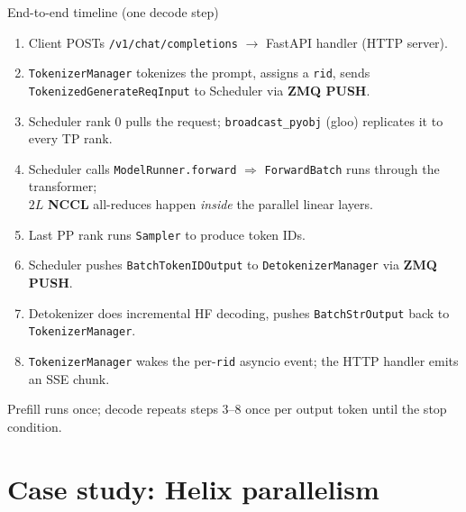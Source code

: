 \documentclass[aspectratio=169,10pt]{beamer}
\begin{document}
\begin{frame}{End-to-end timeline (one decode step)}
  \footnotesize
  \begin{enumerate}\itemsep2pt
    \item Client POSTs \texttt{/v1/chat/completions} $\rightarrow$ FastAPI handler (HTTP server).
    \item \texttt{TokenizerManager} tokenizes the prompt, assigns a \texttt{rid}, sends \texttt{TokenizedGenerateReqInput} to Scheduler via \textcolor{slblue}{\textbf{ZMQ PUSH}}.
    \item Scheduler rank 0 pulls the request; \texttt{broadcast\_pyobj} (gloo) replicates it to every TP rank.
    \item Scheduler calls \texttt{ModelRunner.forward} $\Rightarrow$ \texttt{ForwardBatch} runs through the transformer;\\
          $2L$ \textcolor{slred}{\textbf{NCCL}} all-reduces happen \emph{inside} the parallel linear layers.
    \item Last PP rank runs \texttt{Sampler} to produce token IDs.
    \item Scheduler pushes \texttt{BatchTokenIDOutput} to \texttt{DetokenizerManager} via \textcolor{slblue}{\textbf{ZMQ PUSH}}.
    \item Detokenizer does incremental HF decoding, pushes \texttt{BatchStrOutput} back to \texttt{TokenizerManager}.
    \item \texttt{TokenizerManager} wakes the per-\texttt{rid} asyncio event; the HTTP handler emits an SSE chunk.
  \end{enumerate}
  \vspace{0.3cm}
  \centering\footnotesize Prefill runs once; decode repeats steps 3--8 once per output token until the stop condition.
\end{frame}

\section{Case study: Helix parallelism}
\end{document}
